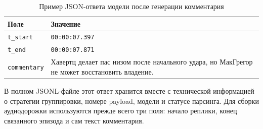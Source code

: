\begin{table}[H]
\centering
\small
\caption{Пример JSON-ответа модели после генерации комментария}
\label{tab:model-output-example}
\begin{tabular}{p{}p{}}
\toprule
Поле & Значение \\
\midrule
\texttt{t\_start} & \texttt{00:00:07.397} \\
\texttt{t\_end} & \texttt{00:00:07.871} \\
\texttt{commentary} & Хавертц делает пас низом после начального удара, но МакГрегор не может восстановить владение. \\
\bottomrule
\end{tabular}
\end{table}

В полном JSONL-файле этот ответ хранится вместе с технической информацией о стратегии группировки, номере payload, модели и статусе парсинга. Для сборки аудиодорожки используются прежде всего три поля: начало реплики, конец связанного эпизода и сам текст комментария.
